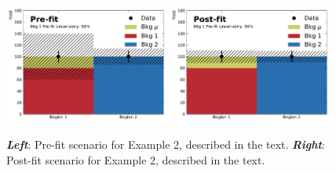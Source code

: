 \begin{figure}[!htb]
    \begin{center}
        \includegraphics[width=0.48\textwidth]{figures/common_ana/stat_hypo/profile_examples/profile_ex_2_pre}
        \includegraphics[width=0.48\textwidth]{figures/common_ana/stat_hypo/profile_examples/profile_ex_2_post}
        \caption{
            \textbf{\textit{Left}}: Pre-fit scenario for Example 2, described in the text.
            \textbf{\textit{Right}}: Post-fit scenario for Example 2, described in the text.
        }
        \label{fig:prof_ex_2_pre}
    \end{center}
\end{figure}

